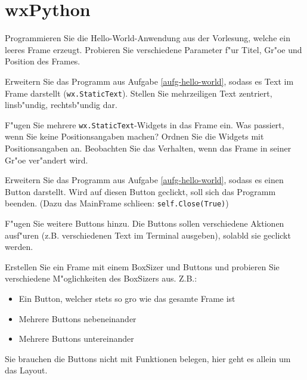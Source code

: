 \section*{wxPython}

\begin{aufgabe}
\label{aufg-hello-world}Programmieren Sie die Hello-World-Anwendung aus der Vorlesung, welche ein leeres Frame erzeugt. Probieren Sie verschiedene Parameter f"ur Titel, Gr"o\3e und Position des Frames.
\end{aufgabe}

\begin{aufgabe}
\begin{teilaufgabe}
Erweitern Sie das Programm aus Aufgabe \ref{aufg-hello-world}, sodass es Text im Frame darstellt (\lstinline{wx.StaticText}). Stellen Sie mehrzeiligen Text zentriert, linsb"undig, rechtsb"undig dar.
\end{teilaufgabe}
\begin{teilaufgabe}
F"ugen Sie mehrere \lstinline{wx.StaticText}-Widgets in das Frame ein. Was passiert, wenn Sie keine Positionsangaben machen? Ordnen Sie die Widgets mit Positionsangaben an. Beobachten Sie das Verhalten, wenn das Frame in seiner Gr"o\3e ver"andert wird.
\end{teilaufgabe}
\end{aufgabe}


\begin{aufgabe}[Buttons]
\begin{teilaufgabe}
Erweitern Sie das Programm aus Aufgabe \ref{aufg-hello-world}, sodass es einen Button darstellt. Wird auf diesen Button geclickt, soll sich das Programm beenden. (Dazu das MainFrame schlie\3en: \lstinline{self.Close(True)})
\end{teilaufgabe}
\begin{teilaufgabe}
F"ugen Sie weitere Buttons hinzu. Die Buttons sollen verschiedene Aktionen ausf"uren (z.B. verschiedenen Text im Terminal ausgeben), solabld sie geclickt werden.
\end{teilaufgabe}
\end{aufgabe}

\begin{aufgabe}[Sizer]
\label{aufg-sizer}
Erstellen Sie ein Frame mit einem BoxSizer und Buttons und probieren Sie verschiedene M"oglichkeiten des BoxSizers aus. Z.B.:
\begin{itemize}
\item Ein Button, welcher stets so gro\3 wie das gesamte Frame ist
\item Mehrere Buttons nebeneinander
\item Mehrere Buttons untereinander
\end{itemize}
Sie brauchen die Buttons nicht mit Funktionen belegen, hier geht es allein um das Layout.
\end{aufgabe}


